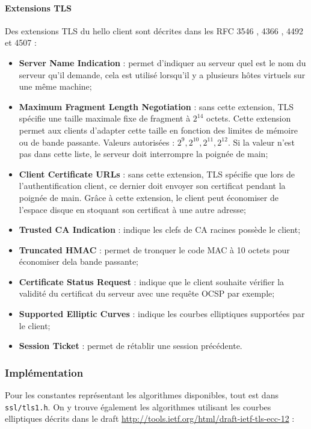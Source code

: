\paragraph{Extensions TLS}
Des extensions TLS du hello client sont décrites dans les RFC 3546 \cite{rfc3546}, 4366 \cite{rfc4366}, 4492 \cite{rfc4492} et 4507 \cite{rfc4507}:
\begin{itemize}
\item \textbf{Server Name Indication} : permet d'indiquer au serveur quel est le nom du serveur qu'il demande, cela est utilisé lorsqu'il y a plusieurs hôtes virtuels sur une même machine;
\item \textbf{Maximum Fragment Length Negotiation} : sans cette extension, TLS spécifie une taille maximale fixe de fragment à $2^{14}$ octets. Cette extension permet aux clients d'adapter cette taille en fonction des limites de mémoire ou de bande passante. Valeurs autorisées : $2^9, 2^{10}, 2^{11}, 2^{12}$. Si la valeur n'est pas dans cette liste, le serveur doit interrompre la poignée de main;
\item \textbf{Client Certificate URLs} : sans cette extension, TLS spécifie que lors de l'authentification client, ce dernier doit envoyer son certificat pendant la poignée de main. Grâce à cette extension, le client peut économiser de l'espace disque en stoquant son certificat à une autre adresse;
\item \textbf{Trusted CA Indication} : indique les clefs de CA racines possède le client;
\item \textbf{Truncated HMAC} : permet de tronquer le code MAC à 10 octets pour économiser dela bande passante;
\item \textbf{Certificate Status Request} : indique que le client souhaite vérifier la validité du certificat du serveur avec une requête OCSP par exemple;
\item \textbf{Supported Elliptic Curves} : indique les courbes elliptiques supportées par le client;
\item \textbf{Session Ticket} : permet de rétablir une session précédente.\\
\end{itemize}

\subsubsection{Implémentation}

Pour les constantes représentant les algorithmes disponibles, tout est dans \verb+ssl/tls1.h+. On y trouve également les algorithmes utilisant les courbes elliptiques décrits dans le draft \url{http://tools.ietf.org/html/draft-ietf-tls-ecc-12} :

